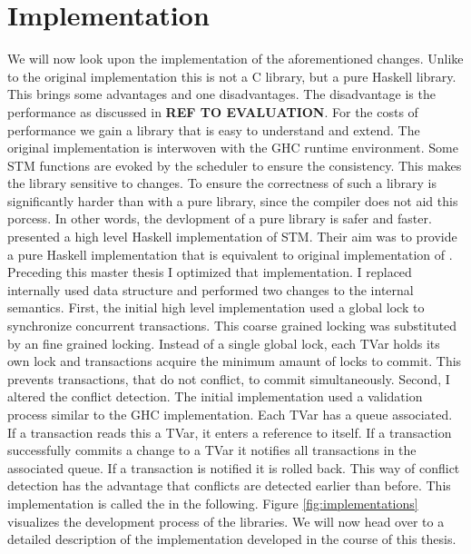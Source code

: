 
\chapter{Implementation} %

\label{Chapter3}

We will now look upon the implementation of the aforementioned changes. Unlike to the original
implementation this is not a C library, but a pure Haskell library. This brings some advantages 
and one disadvantages. The disadvantage is the performance as discussed in \textbf{REF TO EVALUATION}.
For the costs of performance we gain a library that is easy to understand and extend. The original 
implementation is interwoven with the GHC runtime environment. Some STM functions are evoked by 
the scheduler to ensure the consistency. This makes the library sensitive to changes. 
To ensure the correctness of such a library is significantly harder than with a pure library, since
the compiler does not aid this porcess. In other words, the devlopment of a pure library is safer
and faster. \parencite{STMHigh} presented a high level Haskell implementation of STM. Their aim
was to provide a pure Haskell implementation that is equivalent to original implementation of 
\parencite{STMBase}. Preceding this master thesis I optimized that implementation. I replaced
internally used data structure and performed two changes to the internal semantics. First, 
the initial high level implementation used a global lock to synchronize concurrent transactions.
This coarse grained locking was substituted by an fine grained locking. Instead of a single
global lock, each TVar holds its own lock and transactions acquire the minimum amaunt of 
locks to commit. This prevents transactions, that do not conflict, to commit simultaneously.
Second, I altered the conflict detection. The initial implementation used a validation process
similar to the GHC implementation. Each TVar has a queue associated. If a transaction reads this 
a TVar, it enters a reference to itself. If a transaction successfully commits a change to a TVar it 
notifies all transactions in the associated queue. If a transaction is notified it is rolled back.
This way of conflict detection has the advantage that conflicts are detected earlier than before.
This implementation is called the  in the following. Figure 
\ref{fig:implementations} visualizes the development process of the libraries.
We will now head over to a detailed description of the implementation developed in the course of this 
thesis. 

